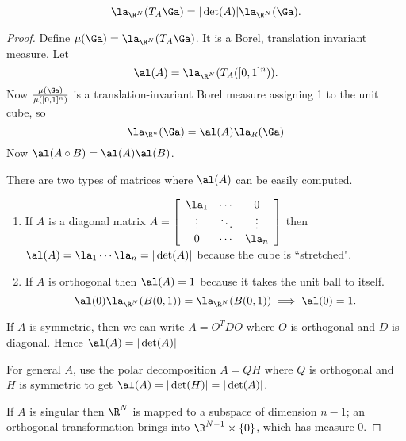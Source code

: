 \begin{thm}
\[\la_{\R^N}(T_A\Ga)=|\det(A)|\la_{\R^N}(\Ga).\]
\end{thm}
\begin{proof}
Define $\mu(\Ga)=\la_{\R^N}(T_A\Ga)$. It is a Borel, translation invariant measure. 
Let
\[
\al(A)=\la_{\R^N}(T_A([0,1]^n)).
\]
Now $\frac{\mu(\Ga)}{\mu([0,1]^n)}$ is a translation-invariant Borel measure assigning 1 to the unit cube, so 
\[\la_{\R^n}(\Ga) =\al(A)\la_{R}(\Ga)\]
Now $\al(A\circ B)=\al(A)\al(B)$.

There are two types of matrices where $\al(A)$ can be easily computed.
\begin{enumerate}
\item
If $A$ is a diagonal matrix $A=\left[\begin{array}{ccc}
\la_{1} & \cdots & 0\\
\vdots & \ddots & \vdots\\
0 & \cdots & \la_{n}\end{array}\right]$
 then $\al(A)=\la_1\cdots\la_n=|\det(A)|$ because the cube is ``stretched".
\item
If $A$ is orthogonal then $\al(A)=1$ because it takes the unit ball to itself. 
\[
\al(0)\la_{\R^N} (B(0,1))=\la_{\R^N}(B(0,1))\implies \al(0)=1.
\]
\end{enumerate}
If $A$ is symmetric, then we can write $A=O^TDO$ where $O$ is orthogonal and $D$ is diagonal. Hence $\al(A)=|\det(A)|$%

For general $A$, use the polar decomposition $A=QH$ where $Q$ is orthogonal and $H$ is symmetric to get $\al(A)=|\det(H)|=|\det(A)|$.

If $A$ is singular then $\R^N$ is mapped to a subspace of dimension $n-1$; %
an orthogonal transformation brings into $\R^{N-1}\times \{0\}$, which has measure 0.
\end{proof}
